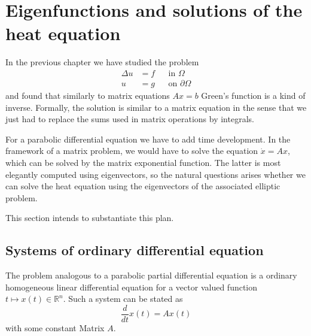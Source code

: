 %
%
%
\section{Eigenfunctions and solutions of the heat equation}
In the previous chapter we have studied the problem
\begin{align*}
\Delta u&=f&&\text{in $\Omega$}\\
u&=g&&\text{on $\partial\Omega$}
\end{align*}
and found that similarly to matrix equations $Ax=b$ Green's function is a kind
of inverse.
Formally, the solution is similar to a matrix equation in the sense
that we just had to replace the sums used in matrix operations by
integrals.

For a parabolic differential equation we have to add time development.
In the framework of a matrix problem, we would have to solve the
equation $\dot x = Ax$, which can be solved by the matrix
exponential function.
The latter is most elegantly computed using eigenvectors, so the
natural questions arises whether we can solve the heat equation
using the eigenvectors of the associated elliptic problem.

This section intends to substantiate this plan.

\subsection{Systems of ordinary differential equation}
The problem analogous to a parabolic partial differential equation
is a ordinary homogeneous linear differential equation for a vector valued
function $t\mapsto x(t)\in\mathbb R^n$.
Such a system can be stated as
\[
\frac{d}{dt}x(t)=Ax(t)
\]
with some constant Matrix $A$.

